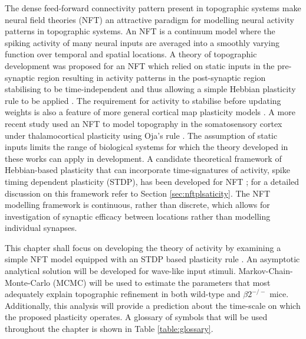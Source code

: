 The dense feed-forward connectivity pattern present in topographic systems make neural field theories (NFT) an attractive paradigm for modelling neural activity patterns in topographic systems. An NFT is a continuum model where the spiking activity of many neural inputs are averaged into a smoothly varying function over temporal and spatial locations. A theory of topographic development was proposed for an NFT which relied on static inputs in the pre-synaptic region resulting in activity patterns in the post-synaptic region stabilising to be time-independent and thus allowing a simple Hebbian plasticity rule to be applied \cite{Amari1977-gc}. The requirement for activity to stabilise before updating weights is also a feature of more general cortical map plasticity models \cite{Stevens2013-ly, Bednar2004-xl}. A more recent study used an NFT to model topography in the somatosensory cortex under thalamocortical plasticity using Oja's rule \cite{Detorakis2012-eh}. The assumption of static inputs limits the range of biological systems for which the theory developed in these works can apply in development. A candidate theoretical framework of Hebbian-based plasticity that can incorporate time-signatures of activity, spike timing dependent plasticity (STDP), has been developed for NFT \cite{Robinson2011-ve, Abbott2000-gl}; for a detailed discussion on this framework refer to Section \ref{sec:nftplsaticity}. The NFT modelling framework is continuous, rather than discrete, which allows for investigation of synaptic efficacy between locations rather than modelling individual synapses.

This chapter shall focus on developing the theory of activity by examining a simple NFT model equipped with an STDP based plasticity rule \cite{Amari1977-gc, Robinson2011-ve}. An asymptotic analytical solution will be developed for wave-like input stimuli. Markov-Chain-Monte-Carlo (MCMC) will be used to estimate the parameters that most adequately explain topographic refinement in both wild-type and $\beta2^{-/-}$ mice. Additionally, this analysis will provide a prediction about the time-scale on which the proposed plasticity operates. A glossary of symbols that will be used throughout the chapter is shown in Table \ref{table:glossary}.


